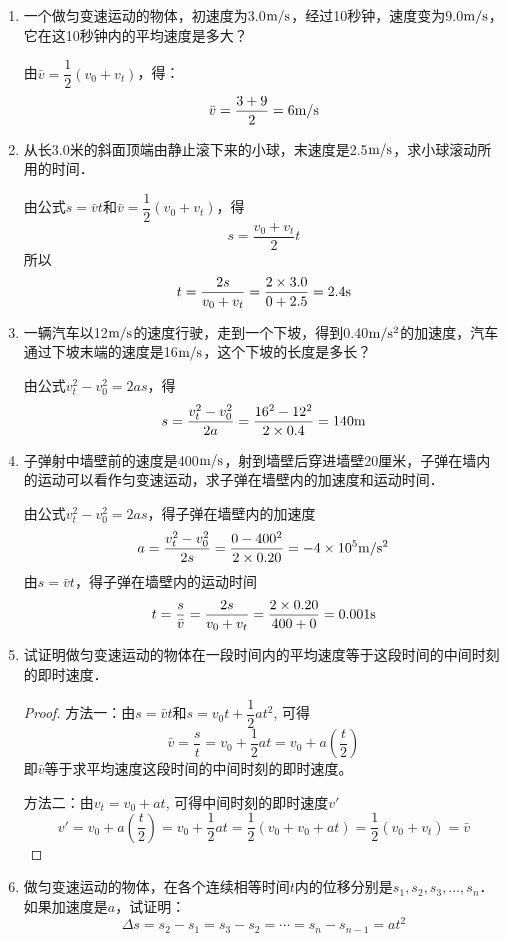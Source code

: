 \begin{enumerate}
\item 一个做匀变速运动的物体，初速度为3.0$\text{m}/\text{s}$，经过10秒钟，速度变为9.0$\text{m}/\text{s}$，它在这10秒钟内的平均速度是多大？   

\begin{solution}
由$\bar v=\dfrac{1}{2}(v_0+v_t)$，得：
\[\bar v=\frac{3+9}{2}=6\text{m}/\text{s}\]
\end{solution}
\item 从长3.0米的斜面顶端由静止滚下来的小球，末速度是2.5$\text{m}/\text{s}$，求小球滚动所用的时间．   

\begin{solution}
   由公式$s=\bar vt$和$\bar v=\dfrac{1}{2}(v_0+v_t)$，得
   \[s=\frac{v_0+v_t}{2}t\]
   所以
   \[t=\frac{2s}{v_0+v_t}=\frac{2\times 3.0}{0+2.5}=2.4{\rm s}\]
\end{solution}
\item 一辆汽车以12$\text{m}/\text{s}$的速度行驶，走到一个下坡，得到0.40$\text{m}/\text{s}^2$的加速度，汽车通过下坡末端的速度是16$\text{m}/\text{s}$，这个下坡的长度是多长？   

\begin{solution}
   由公式$v^2_t-v^2_0=2as$，得
   $$s=\dfrac{v^2_t-v^2_0}{2a}=\frac{16^2-12^2}{2\times 0.4}=140{\rm m}$$
\end{solution}
\item 子弹射中墙壁前的速度是400$\text{m}/\text{s}$，射到墙壁后穿进墙壁20厘米，子弹在墙内的运动可以看作匀变速运动，求子弹在墙壁内的加速度和运动时间．   

\begin{solution}
    由公式$v^2_t-v^2_0=2as$，得子弹在墙壁内的加速度
    $$a=\dfrac{v^2_t-v^2_0}{2s}=\frac{0-400^2}{2\times 0.20}=-4\times 10^5{\rm m/s^2}$$
由$s=\bar v t$，得子弹在墙壁内的运动时间
\[t=\frac{s}{\bar v}=\frac{2s}{v_0+v_t}=\frac{2\times 0.20}{400+0}=0.001{\rm s}\]
\end{solution}
\item 试证明做匀变速运动的物体在一段时间内的平均速度等于这段时间的中间时刻的即时速度．

\begin{proof}
方法一：由$s=\bar v t$和$s=v_0t+\dfrac{1}{2}at^2$, 可得
\[\bar v=\frac{s}{t}=v_0+\frac{1}{2}at =v_0+a\left(\frac{t}{2}\right)\]
即$\bar v$等于求平均速度这段时间的中间时刻的即时速度。

方法二：由$v_t=v_0+at$, 可得中间时刻的即时速度$v'$
\[v'=v_0+a\left(\frac{t}{2}\right)=v_0+\frac{1}{2}at =\frac{1}{2}(v_0+v_0+at)=\frac{1}{2}(v_0+v_t)=\bar v\]
\end{proof}
\item 做匀变速运动的物体，在各个连续相等时间$t$内的位移分别是$s_1, s_2, s_3,\ldots,s_n$．如果加速度是$a$，试证明：
\[\Delta s=s_2-s_1=s_3-s_2=\cdots=s_n-s_{n-1}=at^2 \]


\end{enumerate}
